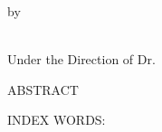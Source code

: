 \pagestyle{empty}
\begin{center}



\vspace{1in}
by\\
\vspace{1in}

\\

\vspace{1.8in}
Under the Direction of Dr. \\
\vspace{.7in}

\newpage
ABSTRACT\\
\bigskip
\end{center}

\begin{doublespace}
\end{doublespace}

\begin{singlespace}

\noindent INDEX WORDS:
\hspace{0.2in}
\parbox[t]{5 in}{}

\end{singlespace}
